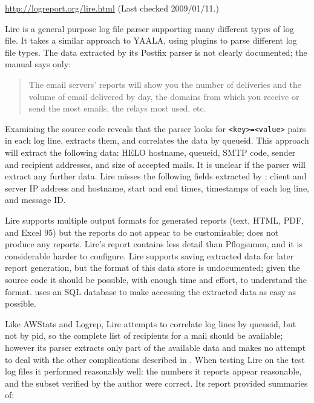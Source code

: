 \noindent{}\url{http://logreport.org/lire.html} \newline{}
(Last checked 2009/01/11.)

Lire is a general purpose log file parser supporting many different types
of log file.  It takes a similar approach to YAALA, using plugins to parse
different log file types.  The data extracted by its Postfix parser is not
clearly documented; the manual says only:

\begin{quotation}

    The email servers' reports will show you the number of deliveries and
    the volume of email delivered by day, the domains from which you
    receive or send the most emails, the relays most used, etc.

\end{quotation}

\noindent{}Examining the source code reveals that the parser looks for
\texttt{<key>=<value>} pairs in each log line, extracts them, and
correlates the data by queueid.  This approach will extract the following
data: HELO hostname, queueid, \gls{SMTP} code, sender and recipient
addresses, and size of accepted mails.  It is unclear if the parser will
extract any further data.  Lire misses the following fields extracted by
\parsername{}: client and server \gls{IP} address and hostname, start and
end times, timestamps of each log line, and message ID\@. 

Lire supports multiple output formats for generated reports (text, HTML,
PDF, and Excel 95) but the reports do not appear to be customisable;
\parsername{} does not produce any reports.  Lire's report contains less
detail than Pflogsumm, and it is considerable harder to configure.  Lire
supports saving extracted data for later report generation, but the format
of this data store is undocumented; given the source code it should be
possible, with enough time and effort, to understand the format.
\parsername{} uses an \gls{SQL} database to make accessing the extracted
data as easy as possible.  

Like AWStats and Logrep, Lire attempts to correlate log lines by queueid,
but not by \gls{pid}, so the complete list of recipients for a mail should
be available; however its parser extracts only part of the available data
and makes no attempt to deal with the other complications described in
.  When testing Lire on the \numberOFlogFILES{}
test log files it performed reasonably well: the numbers it reports appear
reasonable, and the subset verified by the author were correct.  Its report
provided summaries of: 

